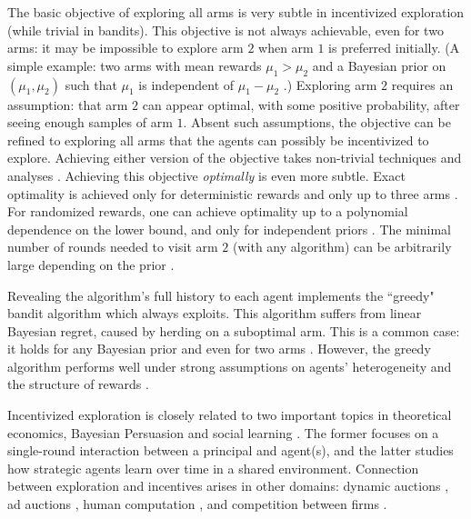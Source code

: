 The basic objective of exploring all arms is very subtle in incentivized exploration (while trivial in bandits). This objective is not always achievable, even for two arms: it may be impossible to explore arm $2$ when arm $1$ is preferred initially. 
(A simple example: two arms with mean rewards $\mu_1>\mu_2$ and a Bayesian prior on $(\mu_1,\mu_2)$ such that $\mu_1$ is independent of $\mu_1-\mu_2$ \citep{ICexploration-ec15}.) Exploring arm $2$ requires an assumption: that arm $2$ can appear optimal, with some positive probability, after seeing enough samples of arm $1$. Absent such assumptions, the objective can be refined to exploring all arms that the agents can possibly be incentivized to explore.  Achieving either version of the objective takes non-trivial techniques and analyses \citep{ICexploration-ec15,ICexplorationGames-ec16}. Achieving this objective \emph{optimally} is even more subtle. Exact optimality is achieved only for deterministic rewards and only up to three arms \citep{Kremer-JPE14,Cohen-Mansour-ec19}. For randomized rewards, one can achieve optimality up to a polynomial dependence on the lower bound, and only for independent priors \citep{Selke-PoIE-ec21}. The minimal number of rounds needed to visit arm $2$ (with any algorithm) can be arbitrarily large depending on the prior \citep{Selke-PoIE-ec21}.

Revealing the algorithm's full history to each agent implements the ``greedy" bandit algorithm which always exploits. This algorithm suffers from linear Bayesian regret, caused by herding on a suboptimal arm. This is a common case: it holds for any Bayesian prior and even for two arms \citep[][Ch. 11]{slivkins-MABbook}. However, the greedy algorithm performs well under strong assumptions on agents' heterogeneity and the structure of rewards \citep{kannan2018smoothed,bastani2017exploiting,Greedy-Manish-18,AcemogluMMO19}.

Incentivized exploration is closely related to two important topics in theoretical economics,
Bayesian Persuasion
\citep{BergemannMorris-survey19,Kamenica-survey19}
and social learning
\citep{Horner-survey16,Golub-survey16}. The former focuses on a single-round interaction between a principal and agent(s), and the latter studies how strategic agents learn over time in a shared environment. Connection between exploration and incentives arises in other domains:
dynamic auctions
    \cite[\eg][]{AtheySegal-econometrica13,DynPivot-econometrica10,Kakade-pivot-or13},
ad auctions
    \cite[\eg][]{MechMAB-ec09,DevanurK09,Transform-ec10-jacm},
human computation
    \cite[\eg][]{RepeatedPA-ec14,Ghosh-itcs13,Krause-www13},
and competition between firms
    \cite[\eg][]{bergemann2000experimentation,keller2003price,CompetingBandits-merged}.


